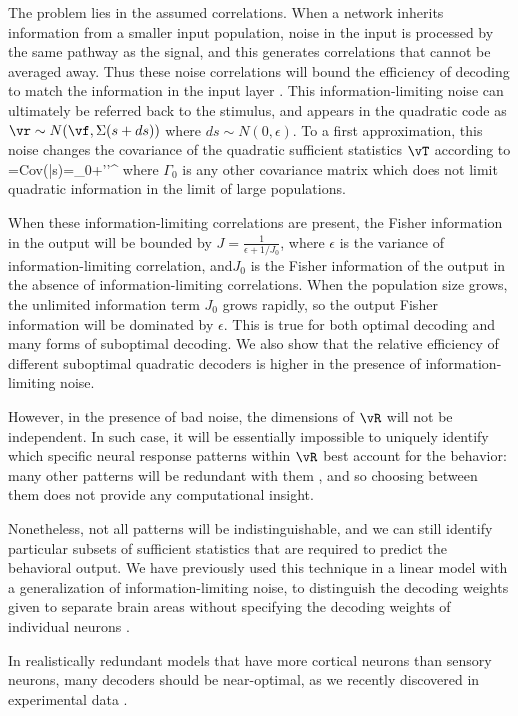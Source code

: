 \documentclass[11pt,twocolumn]{article}
\begin{document}
The problem lies in the assumed correlations. When a network inherits information from a smaller input population, noise in the input is processed by the same pathway as the signal, and this generates correlations that cannot be averaged away. Thus these noise correlations will bound the efficiency of decoding to match the information in the input layer \cite{Moreno}. This information-limiting noise can ultimately be referred back to the stimulus, and appears in the quadratic code as $\vr\sim N(\vf,\Sigma(s+ds))$ where $ds\sim N(0,\epsilon)$. To a first approximation, this noise changes the covariance of the quadratic sufficient statistics $\vT$ according to
\be
\Gamma={\rm Cov}(\vT|s)=\Gamma_0+\epsilon\la\vT\ra'{\la\vT\ra'}^\top
\ee
where $\Gamma_0$ is any other covariance matrix which does not limit quadratic information in the limit of large populations.

When these information-limiting correlations are present, the Fisher information in the output will be bounded by $J=\frac{1}{\epsilon+1/J_0}$, where $\epsilon$ is the variance of information-limiting correlation, and$J_{0}$ is the Fisher information of the output in the absence of information-limiting correlations. When the population size grows, the unlimited information term $J_{0}$ grows rapidly, so the output Fisher information will be dominated by $\epsilon$. This is true for both optimal decoding and many forms of suboptimal decoding. We also show that the relative efficiency of different suboptimal quadratic decoders is higher in the presence of information-limiting noise.


However, in the presence of bad noise, the dimensions of $\vR$ will not be independent. In such case, it will be essentially impossible to uniquely identify which specific neural response patterns within $\vR$ best account for the behavior: many other patterns will be redundant with them \cite{pitkowHow}, and so choosing between them does not provide any computational insight.

Nonetheless, not all patterns will be indistinguishable, and we can still identify particular subsets of sufficient statistics that are required to predict the behavioral output. We have previously used this technique in a linear model with a generalization of information-limiting noise, to distinguish the decoding weights given to separate brain areas without specifying the decoding weights of individual neurons \cite{LakshminarasimhanInfluence,lakshminarasimhanDissecting}.

In realistically redundant models that have more cortical neurons than sensory neurons, many decoders should be near-optimal, as we recently discovered in experimental data \cite{pitkowHow}.
\end{document}
